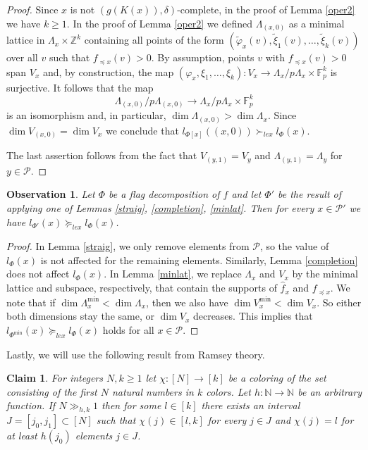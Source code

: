 \documentclass{daj}
\renewcommand{\ge}{\geqslant}
\newcommand{\Z}{\mathbb Z}
\newcommand{\N}{\mathbb N}
\newcommand{\FF}{\mathbb F}
\renewcommand{\P}{\mathcal P}
\newtheorem{claim}[theorem]{Claim}
\newtheorem{obs}[theorem]{Observation}
\theoremstyle{definition}
\theoremstyle{remark}
\theoremstyle{definition}
\theoremstyle{definition}
\begin{document}
\begin{proof}
    Since $x$ is not $(g(K(x)),\delta)$-complete, in the proof of Lemma \ref{oper2} we have $k\ge 1$. 
    In the proof of Lemma \ref{oper2} we defined $\Lambda_{(x, 0)}$ as a minimal lattice in $\Lambda_x \times \Z^k$ containing all points of the form $(\tilde \varphi_x(v), \tilde\xi_1(v), \ldots, \tilde \xi_k(v))$ over all $v$ such that $f_{\preceq x}(v) >0$. By assumption, points $v$ with $f_{\preceq x}(v)>0$ span $V_x$ and, by construction, the map $(\varphi_x, \xi_1, \ldots, \xi_k): V_x \rightarrow \Lambda_x/p\Lambda_x \times \FF_p^k$ is surjective. It follows that the map 
    $$
    \Lambda_{(x, 0)}/p\Lambda_{(x, 0)} \rightarrow \Lambda_x/p\Lambda_x \times \FF_p^k
    $$
    is an isomorphism and, in particular, $\dim \Lambda_{(x, 0)} > \dim \Lambda_{x}$. Since $\dim V_{(x, 0)} = \dim V_x$ we conclude that $l_{\Phi[x]}((x,0)) \succ_{lex} l_{\Phi}(x)$.

    The last assertion follows from the fact that $V_{(y, 1)} = V_y$ and $\Lambda_{(y, 1)} = \Lambda_y$ for $y\in \P$.
\end{proof}

\begin{obs}\label{level3}
    Let $\Phi$ be a flag decomposition of $f$ and let $\Phi'$ be the result of applying one of Lemmas \ref{straig}, \ref{completion}, \ref{minlat}. Then for every $x \in \P'$ we have $l_{\Phi'}(x) \succeq_{lex} l_{\Phi}(x)$.
\end{obs}

\begin{proof}
    In Lemma \ref{straig}, we only remove elements from $\P$, so the value of $l_\Phi(x)$ is not affected for the remaining elements. Similarly, Lemma \ref{completion} does not affect $l_\Phi(x)$. In Lemma \ref{minlat}, we replace $\Lambda_x$ and $V_x$ by the minimal lattice and subspace, respectively, that contain the supports of $\hat f_x$ and $f_{\preceq x}$. We note that if $\dim \Lambda_x^{\text{min}} < \dim \Lambda_x$, then we also have $\dim V_{x}^{\text{min}} <  \dim V_x$. So either both dimensions stay the same, or $\dim V_x$ decreases. This implies that $l_{\Phi^{\text{min}}}(x) \succeq_{lex} l_{\Phi}(x)$ holds for all $x \in \P$.
\end{proof}


Lastly, we will use the following result from Ramsey theory.

\begin{claim}\label{konig}
For integers $N, k \ge 1$ let $\chi: [N] \rightarrow [k]$ be a coloring of the set consisting of the first $N$ natural numbers in $k$ colors. Let $h:\N \rightarrow \N$ be an arbitrary function. If $N \gg_{h, k} 1$ then for some $l \in [k]$ there exists an interval $J = [j_0, j_1] \subset [N]$ such that $\chi(j) \in [l, k]$ for every $j \in J$ and $\chi(j) = l$ for at least $h(j_0)$ elements $j \in J$. 
\end{claim}
\end{document}
